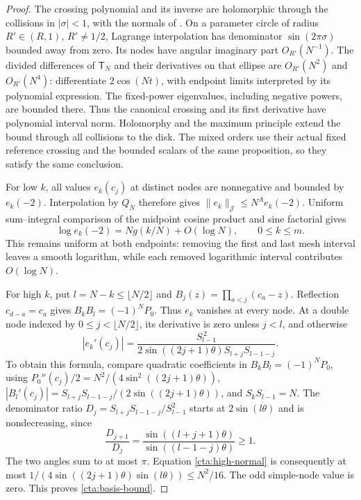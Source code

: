 \begin{proof}
The crossing polynomial and its inverse are holomorphic
through the collisions in \(|\sigma|<1\), with the normals of
\cite[Proposition~6.1]{Meridian}. On a parameter circle of radius
\(R'\in(R,1)\), \(R'\ne1/2\), Lagrange interpolation has
denominator \(\sin(2\pi\sigma)\) bounded away from zero.
Its nodes have angular imaginary part \(O_{R'}(N^{-1})\).
The divided differences of \(\mathsf T_N\) and their derivatives
on that ellipse are \(O_{R'}(N^2)\) and \(O_{R'}(N^4)\):
differentiate \(2\cos(Nt)\), with endpoint limits interpreted
by its polynomial expression. The fixed-power eigenvalues,
including negative powers, are bounded there. Thus the canonical
crossing and its first derivative have polynomial interval norm.
Holomorphy and the maximum principle extend the bound through
all collisions to the disk. The mixed orders use their actual
fixed reference crossing and the bounded scalars of the same
proposition, so they satisfy the same conclusion.

For low \(k\), all values \(e_k(c_j)\) at distinct nodes are
nonnegative and bounded by \(e_k(-2)\). Interpolation by \(Q_N\)
therefore gives \(\|e_k\|_{\mathcal J}\le N^A e_k(-2)\).
Uniform sum--integral comparison of the midpoint cosine product
and sine factorial gives
\[
 \log e_k(-2)=Ng(k/N)+O(\log N),\qquad 0\le k\le m.
\]
This remains uniform at both endpoints: removing the first and
last mesh interval leaves a smooth logarithm, while each removed
logarithmic interval contributes \(O(\log N)\).

For high \(k\), put \(l=N-k\le\lfloor N/2\rfloor\) and
\(B_j(z)=\prod_{a<j}(c_a-z)\).
Reflection \(c_{d-a}=c_a\) gives
\(B_kB_l=(-1)^N P_0\). Thus \(e_k\) vanishes at every node.
At a double node indexed by \(0\le j<\lfloor N/2\rfloor\),
its derivative is zero unless \(j<l\), and otherwise
\begin{equation}\label{cta:high-normal}
 |e_k'(c_j)|
 =\frac{S_{l-1}^{\,2}}
 {2\sin((2j+1)\theta)S_{l+j}S_{l-1-j}}.
\end{equation}
To obtain this formula, compare quadratic coefficients in
\(B_kB_l=(-1)^NP_0\), using
\(P_0''(c_j)/2=N^2/(4\sin^2((2j+1)\theta))\),
\(|B_l'(c_j)|=S_{l+j}S_{l-1-j}/(2\sin((2j+1)\theta))\),
and \(S_kS_{l-1}=N\).
The denominator ratio
\(D_j=S_{l+j}S_{l-1-j}/S_{l-1}^2\) starts at
\(2\sin(l\theta)\) and is nondecreasing, since
\[
 \frac{D_{j+1}}{D_j}
   =\frac{\sin((l+j+1)\theta)}{\sin((l-1-j)\theta)}\ge1.
\]
The two angles sum to at most \(\pi\).
Equation \eqref{cta:high-normal} is consequently at most
\(1/(4\sin((2j+1)\theta)\sin(l\theta))\le N^2/16\).
The odd simple-node value is zero. This proves \eqref{cta:basis-bound}.
\end{proof}

